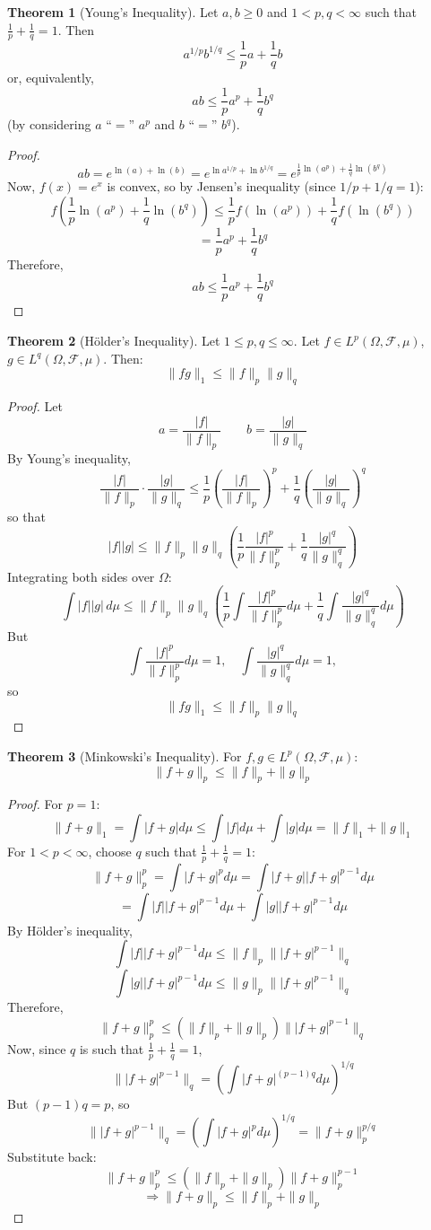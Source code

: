 \documentclass[11pt,a4paper]{article}
\theoremstyle{definition}
\newtheorem{theorem}{Theorem}[section]
\begin{document}
\begin{theorem} [Young's Inequality]
Let $a, b \geq 0$ and $1 < p, q < \infty$ such that $\frac{1}{p} + \frac{1}{q} = 1$. Then
\[
a^{1/p}b^{1/q} \leq \frac{1}{p}a + \frac{1}{q}b
\]
or, equivalently,
\[
ab \leq \frac{1}{p} a^p + \frac{1}{q} b^q
\]
(by considering $a$ ``$=$'' $a^p$ and $b$ ``$=$'' $b^q$).
\end{theorem}
\begin{proof}
\[
ab = e^{\ln(a) + \ln(b)} 
= e^{\ln a^{1/p} + \ln b^{1/q}} 
= e^{\frac{1}{p}\ln(a^p) + \frac{1}{q}\ln(b^q)}
\]
Now, $f(x) = e^x$ is convex, so by Jensen's inequality (since $1/p + 1/q = 1$):
\[
f\left(\frac{1}{p} \ln(a^p) + \frac{1}{q} \ln(b^q)\right) \leq \frac{1}{p} f(\ln(a^p)) + \frac{1}{q} f(\ln(b^q))
\]
\[
= \frac{1}{p}a^p + \frac{1}{q}b^q
\]
Therefore,
\[
ab \leq \frac{1}{p}a^p + \frac{1}{q}b^q
\]
\end{proof}

\begin{theorem}[Hölder's Inequality]
Let $1 \leq p, q \leq \infty$. Let $f \in L^{p}(\Omega, \mathcal{F}, \mu)$, $g \in L^{q}(\Omega, \mathcal{F}, \mu)$. Then:
\[
\|fg\|_1 \leq \|f\|_p \|g\|_q
\]
\end{theorem}

\begin{proof}
Let
\[
a = \frac{|f|}{\|f\|_p} \qquad b = \frac{|g|}{\|g\|_q}
\]
By Young's inequality,
\[
\frac{|f|}{\|f\|_p} \cdot \frac{|g|}{\|g\|_q}
\leq \frac{1}{p} \left( \frac{|f|}{\|f\|_p} \right)^{p}
+ \frac{1}{q} \left( \frac{|g|}{\|g\|_q} \right)^{q}
\]
so that
\[
|f||g| \leq \|f\|_p \|g\|_q \left( \frac{1}{p} \frac{|f|^p}{\|f\|_p^p} + \frac{1}{q} \frac{|g|^q}{\|g\|_q^q} \right)
\]
Integrating both sides over $\Omega$:
\[
\int |f||g| \, d\mu
\leq \|f\|_p \|g\|_q \left(
\frac{1}{p} \int \frac{|f|^p}{\|f\|_p^p} d\mu + \frac{1}{q} \int \frac{|g|^q}{\|g\|_q^q} d\mu
\right)
\]
But
\[
\int \frac{|f|^p}{\|f\|_p^p} d\mu = 1, \quad \int \frac{|g|^q}{\|g\|_q^q} d\mu = 1,
\]
so
\[
\|fg\|_1 \leq \|f\|_p \|g\|_q
\]
\end{proof}
\begin{theorem}[Minkowski's Inequality]
For $f, g \in L^p(\Omega, \mathcal{F}, \mu)$:
\[
\|f+g\|_p \leq \|f\|_p + \|g\|_p
\]
\end{theorem}

\begin{proof}
For $p = 1$:
\[
\|f+g\|_1 = \int |f+g| d\mu \leq \int |f| d\mu + \int |g| d\mu = \|f\|_1 + \|g\|_1
\]
For $1 < p < \infty$, choose $q$ such that $\frac{1}{p} + \frac{1}{q} = 1$:
\[
\|f+g\|_p^p = \int |f+g|^p d\mu = \int |f+g||f+g|^{p-1} d\mu
\]
\[
= \int |f||f+g|^{p-1} d\mu + \int |g||f+g|^{p-1} d\mu
\]
By Hölder's inequality,
\[
\int |f||f+g|^{p-1} d\mu \leq \|f\|_p \||f+g|^{p-1}\|_q
\]
\[
\int |g||f+g|^{p-1} d\mu \leq \|g\|_p \||f+g|^{p-1}\|_q
\]
Therefore,
\[
\|f+g\|_p^p \leq (\|f\|_p + \|g\|_p) \||f+g|^{p-1}\|_q
\]
Now, since $q$ is such that $\frac{1}{p} + \frac{1}{q} = 1$,
\[
\||f+g|^{p-1}\|_q = \left( \int |f+g|^{(p-1)q} d\mu \right)^{1/q}
\]
But $(p-1)q = p$, so
\[
\||f+g|^{p-1}\|_q = \left( \int |f+g|^p d\mu \right)^{1/q} = \|f+g\|_p^{p/q}
\]
Substitute back:
\[
\|f+g\|_p^p \leq (\|f\|_p + \|g\|_p) \|f+g\|_p^{p-1}
\]
\[
\Rightarrow \|f+g\|_p \leq \|f\|_p + \|g\|_p
\]
\end{proof}
\end{document}
